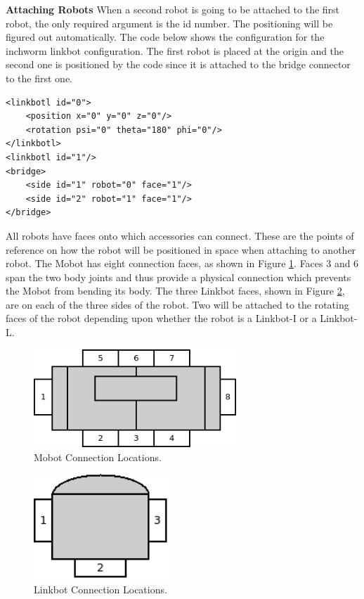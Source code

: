 \documentclass{article}
\begin{document}
\noindent
\newline
\textbf{Attaching Robots}
\newline
When a second robot is going to be attached to the first robot, the only
required argument is the id number.  The positioning will be figured out
automatically.  The code below shows the configuration for the inchworm linkbot
configuration.  The first robot is placed at the origin and the second one is
positioned by the code since it is attached to the bridge connector to the first
one.
\begin{verbatim}
<linkbotl id="0">
    <position x="0" y="0" z="0"/>
    <rotation psi="0" theta="180" phi="0"/>
</linkbotl>
<linkbotl id="1"/>
<bridge>
    <side id="1" robot="0" face="1"/>
    <side id="2" robot="1" face="1"/>
</bridge>
\end{verbatim}

All robots have faces onto which accessories can connect.  These are the points
of reference on how the robot will be positioned in space when attaching to
another robot.  The Mobot has eight connection faces, as shown in Figure
\ref{fig:mobot_connections}.  Faces 3 and 6 span the two body joints and thus
provide a physical connection which prevents the Mobot from bending its body.
The three Linkbot faces, shown in Figure \ref{fig:linkbot_connections}, are on
each of the three sides of the robot.  Two will be attached to the rotating
faces of the robot depending upon whether the robot is a Linkbot-I or a
Linkbot-L.
\begin{figure}[H]
	\begin{center}
		\includegraphics[width=3in]{images/mobot_connections}
	\end{center}
	\caption{Mobot Connection Locations.}
	\label{fig:mobot_connections}
\end{figure}
\begin{figure}[H]
	\begin{center}
		\includegraphics[width=2in]{images/linkbot_connections}
	\end{center}
	\caption{Linkbot Connection Locations.}
	\label{fig:linkbot_connections}
\end{figure}
\end{document}
